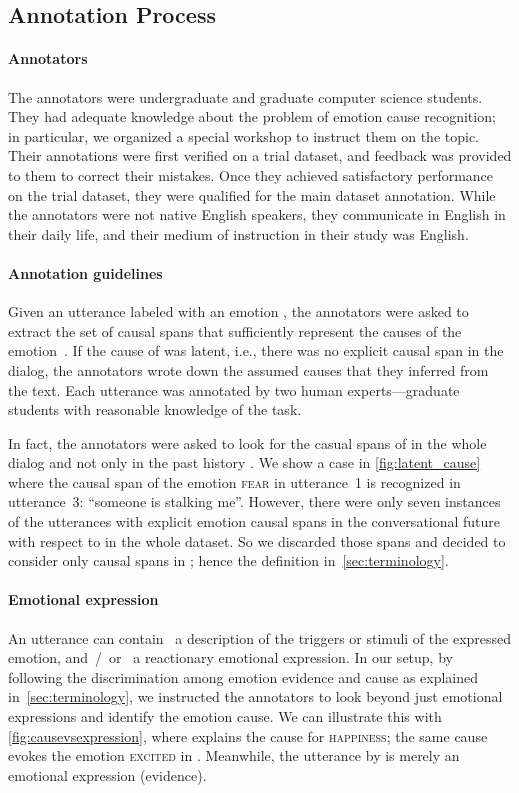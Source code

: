 \documentclass[smallextended]{svjour3}
\newcommand\emo[1]{\textsc{#1}}
\newcommand\0{\hphantom{0}}
\begin{document}
\subsection{Annotation Process}\label{sec:annot}


\paragraph{Annotators}
The annotators were undergraduate and graduate computer science students. They had adequate knowledge about the problem of emotion cause recognition; in particular, we organized a special workshop to instruct them on the topic. Their annotations were first verified on a trial dataset, and feedback was provided to them to correct their mistakes. Once they achieved satisfactory performance on the trial dataset, they were qualified for the main dataset annotation. While the annotators were not native English speakers, they communicate in English in their daily life, and their medium of instruction in their study was English.


\paragraph{Annotation guidelines}
Given an utterance  labeled with an emotion , the annotators were asked to extract the set of causal spans  
that sufficiently represent the causes of the emotion~. If the cause of  was latent, i.e., there was no explicit causal span in the dialog,
the annotators wrote down the assumed causes that they inferred from the text. Each utterance was annotated by two human experts---graduate students with reasonable knowledge of the task.

In fact, the annotators were asked to look for the casual spans of  in the whole dialog and not only in the past history . We show 
a
case in \cref{fig:latent_cause} where the causal span of the emotion \emo{fear} in utterance~1 is recognized in utterance~3: ``someone is stalking me''.
However, 
there were
only seven instances of the utterances with explicit emotion causal spans 
in the conversational future with respect to  in the whole dataset.
So
we discarded those spans and decided to consider only causal spans in ; hence the definition in~\cref{sec:terminology}.

\paragraph{Emotional expression}
An utterance can contain \textit{}~a description of the triggers or stimuli of the expressed emotion, and~/~or \textit{}~a reactionary emotional expression. 
In our setup, by following the discrimination among emotion evidence and cause as explained in~\cref{sec:terminology}, we instructed the annotators to look beyond just emotional expressions and 
identify the 
emotion cause. We can illustrate this with
\cref{fig:causevsexpression}, where  explains the cause for \emo{happiness}; the same cause evokes the emotion \emo{excited} in . Meanwhile, the utterance  by  is merely an emotional expression (evidence).
\end{document}
